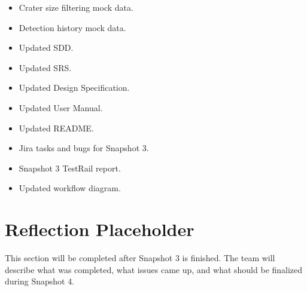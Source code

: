 \documentclass[12pt]{article}
\begin{document}
\begin{itemize}
    \item Crater size filtering mock data.
    \item Detection history mock data.
    \item Updated SDD.
    \item Updated SRS.
    \item Updated Design Specification.
    \item Updated User Manual.
    \item Updated README.
    \item Jira tasks and bugs for Snapshot 3.
    \item Snapshot 3 TestRail report.
    \item Updated workflow diagram.
\end{itemize}

\section{Reflection Placeholder}

This section will be completed after Snapshot 3 is finished. The team will describe what was completed, what issues came up, and what should be finalized during Snapshot 4.
\end{document}
